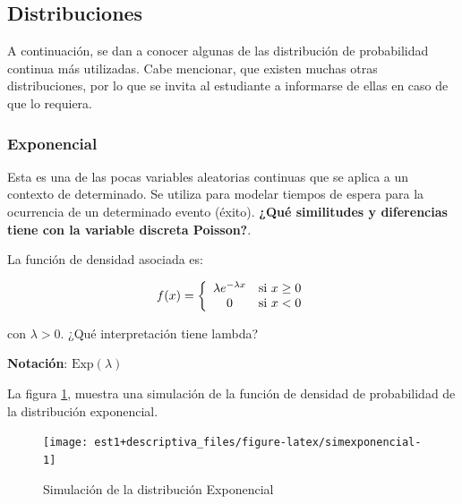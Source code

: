 \documentclass[
  11pt,
]{book}
\theoremstyle{definition}
\theoremstyle{definition}
\theoremstyle{definition}
\theoremstyle{definition}
\theoremstyle{remark}
\begin{document}
\subsection{Distribuciones}\label{probabilidad-variable-aleatoria-continua-distribuciones}

A continuación, se dan a conocer algunas de las distribución de probabilidad continua más utilizadas. Cabe mencionar, que existen muchas otras distribuciones, por lo que se invita al estudiante a informarse de ellas en caso de que lo requiera.

\subsubsection{Exponencial}\label{probabilidad-variable-aleatoria-continua-distribuciones-exponencial}

Esta es una de las pocas variables aleatorias continuas que se aplica a un contexto de determinado. Se utiliza para modelar tiempos de espera para la ocurrencia de un determinado evento (éxito). \textbf{¿Qué similitudes y diferencias tiene con la variable discreta Poisson?}.

La función de densidad asociada es:

\begin{equation}
\notag
f(x)= \left\lbrace
\begin{array}{cl}
\lambda e^{ -\lambda x} & \text{si } x \geq 0\\
0 & \text{si } x < 0
\end{array}
\right.
\end{equation}

con \(\lambda > 0\). ¿Qué interpretación tiene lambda?

\textbf{Notación}: \(\text{Exp}(\lambda)\)

La figura \ref{fig:simexponencial}, muestra una simulación de la función de densidad de probabilidad de la distribución exponencial.

\begin{figure}

{\centering \texttt{[image: est1+descriptiva\_files/figure-latex/simexponencial-1]} 

}

\caption{Simulación de la distribución Exponencial}\label{fig:simexponencial}
\end{figure}
\end{document}

